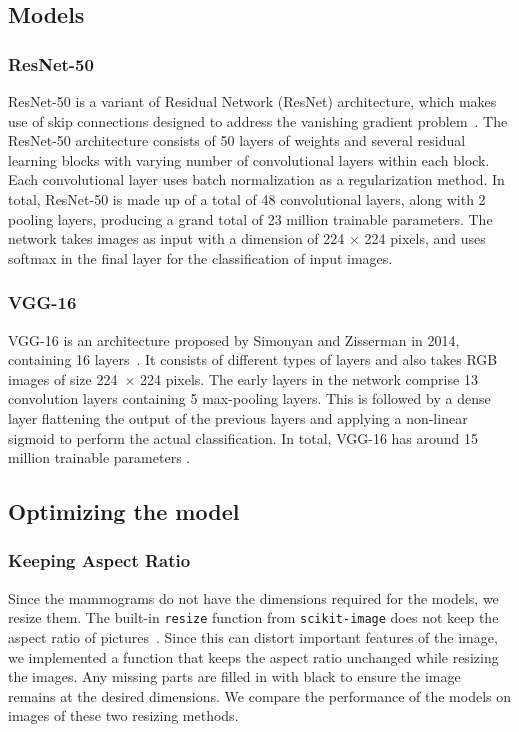 \documentclass[sn-mathphys,Numbered]{sn-jnl}%
\theoremstyle{thmstyleone}%
\theoremstyle{thmstyletwo}%
\theoremstyle{thmstylethree}%
\begin{document}
\subsection{Models}
\label{Models}
\subsubsection{ResNet-50}
\label{ResNet}
ResNet-50 is a variant of Residual Network (ResNet) architecture, which makes use of skip connections designed to address the vanishing gradient problem~\cite{he2015deep}. The ResNet-50 architecture consists of 50 layers of weights and several residual learning blocks with varying number of convolutional layers within each block. Each convolutional layer uses batch normalization as a regularization method. In total, ResNet-50 is made up of a total of  48 convolutional layers, along with 2 pooling layers, producing a grand total of 23 million trainable parameters. The network takes images as input with a dimension of 224 $\times$ 224 pixels, and uses softmax in the final layer for the classification of input images.
\subsubsection{VGG-16}
\label{VGG-16}
VGG-16 is an architecture proposed by Simonyan and Zisserman in 2014, containing 16 layers~\cite{Alzubaidi_2021}. It consists of different types of layers and also takes RGB images of size 224~$\times$ 224 pixels. The early layers in the network comprise 13 convolution layers containing 5 max-pooling layers. This is followed by a dense layer flattening the output of the previous layers and applying a non-linear sigmoid to perform the actual classification. In total, VGG-16 has around 15 million trainable parameters \cite{Rahdika_2020}.
\subsection{Optimizing the model}
\label{Optimization}
\subsubsection{Keeping Aspect Ratio}
\label{HeightWidth}
Since the mammograms do not have the dimensions required for the models, we resize them. The built-in \verb|resize| function from \verb|scikit-image| does not keep the aspect ratio of pictures~\cite{resize}. Since this can distort important features of the image, we implemented a function that keeps the aspect ratio unchanged while resizing the images. Any missing parts are filled in with black to ensure the image remains at the desired dimensions. We compare the performance of the models on images of these two resizing methods.
\end{document}
